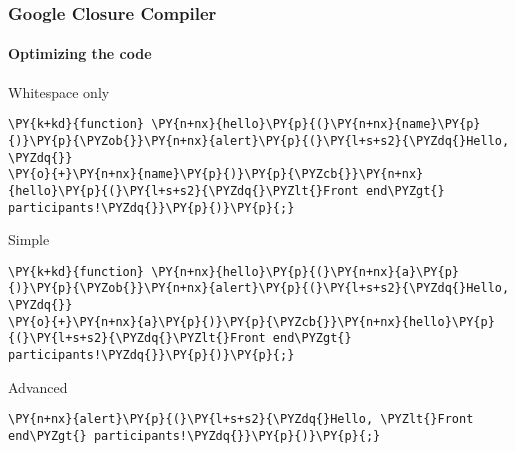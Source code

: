 \begin{frame}[fragile]
  \frametitle{Google Closure Compiler}
  \framesubtitle{Optimizing the code}

  \begin{block}{Whitespace only}
\begin{Verbatim}[commandchars=\\\{\}]
\PY{k+kd}{function} \PY{n+nx}{hello}\PY{p}{(}\PY{n+nx}{name}\PY{p}{)}\PY{p}{\PYZob{}}\PY{n+nx}{alert}\PY{p}{(}\PY{l+s+s2}{\PYZdq{}Hello, \PYZdq{}}
\PY{o}{+}\PY{n+nx}{name}\PY{p}{)}\PY{p}{\PYZcb{}}\PY{n+nx}{hello}\PY{p}{(}\PY{l+s+s2}{\PYZdq{}\PYZlt{}Front end\PYZgt{} participants!\PYZdq{}}\PY{p}{)}\PY{p}{;}
\end{Verbatim}
  \end{block}

  \pause

  \begin{block}{Simple}
\begin{Verbatim}[commandchars=\\\{\}]
\PY{k+kd}{function} \PY{n+nx}{hello}\PY{p}{(}\PY{n+nx}{a}\PY{p}{)}\PY{p}{\PYZob{}}\PY{n+nx}{alert}\PY{p}{(}\PY{l+s+s2}{\PYZdq{}Hello, \PYZdq{}}
\PY{o}{+}\PY{n+nx}{a}\PY{p}{)}\PY{p}{\PYZcb{}}\PY{n+nx}{hello}\PY{p}{(}\PY{l+s+s2}{\PYZdq{}\PYZlt{}Front end\PYZgt{} participants!\PYZdq{}}\PY{p}{)}\PY{p}{;}
\end{Verbatim}
  \end{block}

  \pause

  \begin{block}{Advanced}
\begin{Verbatim}[commandchars=\\\{\}]
\PY{n+nx}{alert}\PY{p}{(}\PY{l+s+s2}{\PYZdq{}Hello, \PYZlt{}Front end\PYZgt{} participants!\PYZdq{}}\PY{p}{)}\PY{p}{;}
\end{Verbatim}

  \end{block}
\end{frame}



